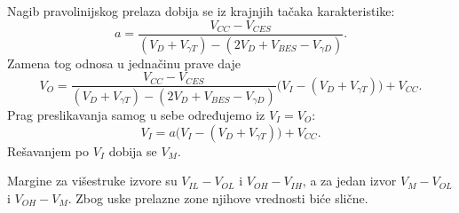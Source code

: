 Nagib pravolinijskog prelaza dobija se iz krajnjih tačaka karakteristike:
\[a=\frac{V_{CC}-V_{CES}}{(V_D+V_{\gamma T})-(2V_D+V_{BES}-V_{\gamma D})}.\]
Zamena tog odnosa u jednačinu prave daje
\[V_O=\frac{V_{CC}-V_{CES}}{(V_D+V_{\gamma T})-(2V_D+V_{BES}-V_{\gamma D})}\bigl(V_I-(V_D+V_{\gamma T})\bigr)+V_{CC}.\]
Prag preslikavanja samog u sebe određujemo iz $V_I=V_O$:
\[V_I=a\bigl(V_I-(V_D+V_{\gamma T})\bigr)+V_{CC}.\]
Rešavanjem po $V_I$ dobija se $V_M$.

Margine za višestruke izvore su $V_{IL}-V_{OL}$ i $V_{OH}-V_{IH}$, a za jedan izvor $V_M-V_{OL}$ i $V_{OH}-V_M$. Zbog uske prelazne zone njihove vrednosti biće slične.
